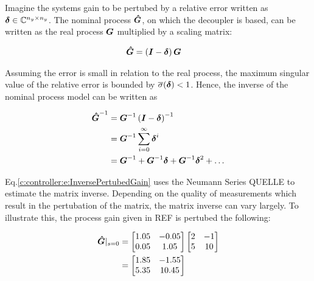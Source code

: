 Imagine the systems gain to be pertubed by a relative error written as $\mbox{\boldmath$\delta$} \in \mathbb{C}^{n_y \times n_y}$. The nominal process $\mbox{\boldmath$\hat{G}$}$, on which the decoupler is based, can be written as the real process $\mbox{\boldmath$G$}$ multiplied by a scaling matrix:

\begin{align}
\begin{split}
\mbox{\boldmath$\hat{G}$} &= \left( \mbox{\boldmath$I$} - \mbox{\boldmath$\delta$} \right) \mbox{\boldmath$G$}
\end{split}
\label{c:controller:e:PertubedGain}
\end{align}

Assuming the error is small in relation to the real process, the maximum singular value of the relative error is bounded by $\overline{\sigma}(\mbox{\boldmath$\delta$}) < 1$. Hence, the inverse of the nominal process model can be written as

\begin{align}
\begin{split}
\mbox{\boldmath$\hat{G}$}^{-1} &= \mbox{\boldmath$G$}^{-1} \left( \mbox{\boldmath$I$} - \mbox{\boldmath$\delta$} \right)^{-1} \\
&= \mbox{\boldmath$G$}^{-1} \sum_{i=0}^\infty \mbox{\boldmath$\delta$}^i  \\
&= \mbox{\boldmath$G$}^{-1} + \mbox{\boldmath$G$}^{-1} \mbox{\boldmath$\delta$} + \mbox{\boldmath$G$}^{-1}\mbox{\boldmath$\delta$}^2 + \dots
\end{split}
\label{c:controller:e:InversePertubedGain}
\end{align}

Eq.\ref{c:controller:e:InversePertubedGain} uses the Neumann Series QUELLE to estimate the matrix inverse. Depending on the quality of measurements which result in the pertubation of the matrix, the matrix inverse can vary largely. To illustrate this, the process gain given in REF is pertubed the following:

\begin{align}
\begin{split}
\mbox{\boldmath$\hat{G}$}|_{s=0} &= \begin{bmatrix} 
1.05 & -0.05 \\
0.05 & 1.05
\end{bmatrix}
\begin{bmatrix}
2 & -1 \\
5 & 10
\end{bmatrix} \\
&= \begin{bmatrix}
1.85 & -1.55 \\
5.35 & 10.45
\end{bmatrix}
\end{split}
\label{c:controller:e:PertubedExample}
\end{align}

